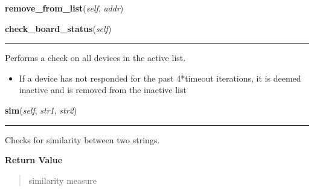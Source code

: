     \vspace{0.5ex}

\hspace{.8\funcindent}\begin{boxedminipage}{\funcwidth}

    \raggedright \textbf{remove\_from\_list}(\textit{self}, \textit{addr})

\setlength{\parskip}{2ex}
\setlength{\parskip}{1ex}
    \end{boxedminipage}

    \label{sensor_thread:Sensor:check_board_status}

    \vspace{0.5ex}

\hspace{.8\funcindent}\begin{boxedminipage}{\funcwidth}

    \raggedright \textbf{check\_board\_status}(\textit{self})

    \vspace{-1.5ex}

    \rule{\textwidth}{0.5\fboxrule}
\setlength{\parskip}{2ex}
    Performs a check on all devices in the active list.

    \begin{itemize}
    \setlength{\parskip}{0.6ex}
      \item If a device has not responded for the past 4*timeout iterations, it
        is deemed inactive and is removed from the inactive list

    \end{itemize}

\setlength{\parskip}{1ex}
    \end{boxedminipage}

    \label{sensor_thread:Sensor:sim}

    \vspace{0.5ex}

\hspace{.8\funcindent}\begin{boxedminipage}{\funcwidth}

    \raggedright \textbf{sim}(\textit{self}, \textit{str1}, \textit{str2})

    \vspace{-1.5ex}

    \rule{\textwidth}{0.5\fboxrule}
\setlength{\parskip}{2ex}
    Checks for similarity between two strings.

\setlength{\parskip}{1ex}
      \textbf{Return Value}
    \vspace{-1ex}

      \begin{quote}
      similarity measure

      \end{quote}

    \end{boxedminipage}

